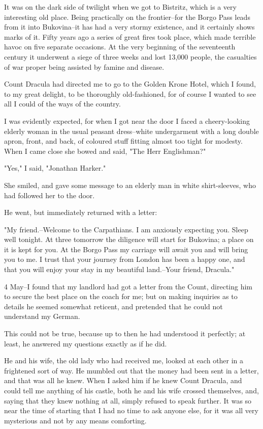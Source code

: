 It was on the dark side of twilight when we got to Bistritz, which is a very interesting old place. Being practically on the frontier--for the Borgo Pass leads from it into Bukovina--it has had a very stormy existence, and it certainly shows marks of it. Fifty years ago a series of great fires took place, which made terrible havoc on five separate occasions. At the very beginning of the seventeenth century it underwent a siege of three weeks and lost 13,000 people, the casualties of war proper being assisted by famine and disease. 

Count Dracula had directed me to go to the Golden Krone Hotel, which I found, to my great delight, to be thoroughly old-fashioned, for of course I wanted to see all I could of the ways of the country. 

I was evidently expected, for when I got near the door I faced a cheery-looking elderly woman in the usual peasant dress--white undergarment with a long double apron, front, and back, of coloured stuff fitting almost too tight for modesty. When I came close she bowed and said, "The Herr Englishman?" 

"Yes," I said, "Jonathan Harker." 

She smiled, and gave some message to an elderly man in white shirt-sleeves, who had followed her to the door. 

He went, but immediately returned with a letter: 

"My friend.--Welcome to the Carpathians. I am anxiously expecting you. Sleep well tonight. At three tomorrow the diligence will start for Bukovina; a place on it is kept for you. At the Borgo Pass my carriage will await you and will bring you to me. I trust that your journey from London has been a happy one, and that you will enjoy your stay in my beautiful land.--Your friend, Dracula." 

4 May--I found that my landlord had got a letter from the Count, directing him to secure the best place on the coach for me; but on making inquiries as to details he seemed somewhat reticent, and pretended that he could not understand my German. 

This could not be true, because up to then he had understood it perfectly; at least, he answered my questions exactly as if he did. 

He and his wife, the old lady who had received me, looked at each other in a frightened sort of way. He mumbled out that the money had been sent in a letter, and that was all he knew. When I asked him if he knew Count Dracula, and could tell me anything of his castle, both he and his wife crossed themselves, and, saying that they knew nothing at all, simply refused to speak further. It was so near the time of starting that I had no time to ask anyone else, for it was all very mysterious and not by any means comforting. 

